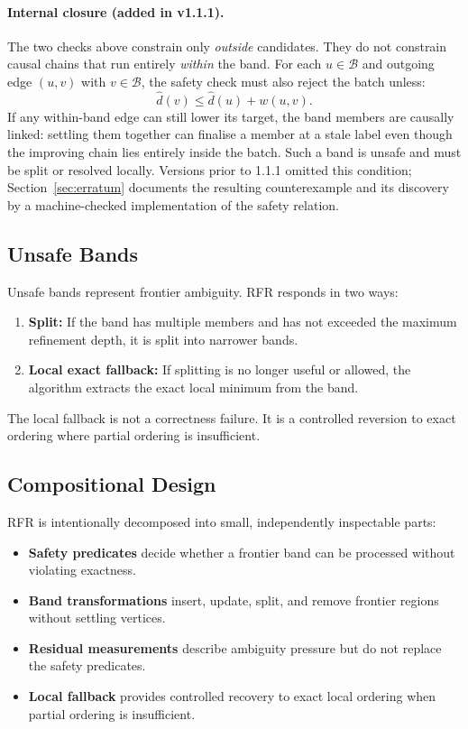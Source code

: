 \documentclass[11pt]{article}
\newcommand{\RFR}{\textsc{RFR}}
\newcommand{\band}{\mathcal{B}}
\begin{document}
\paragraph{Internal closure (added in v1.1.1).}
The two checks above constrain only \emph{outside} candidates. They do not
constrain causal chains that run entirely \emph{within} the band. For each
$u\in\band$ and outgoing edge $(u,v)$ with $v\in\band$, the safety check
must also reject the batch unless:
\[
  \hat d(v) \le \hat d(u) + w(u,v).
\]
If any within-band edge can still lower its target, the band members are
causally linked: settling them together can finalise a member at a stale
label even though the improving chain lies entirely inside the batch. Such a
band is unsafe and must be split or resolved locally. Versions prior to
1.1.1 omitted this condition; Section~\ref{sec:erratum} documents the
resulting counterexample and its discovery by a machine-checked
implementation of the safety relation.

\subsection{Unsafe Bands}

Unsafe bands represent frontier ambiguity. \RFR{} responds in two ways:

\begin{enumerate}
  \item \textbf{Split:} If the band has multiple members and has not exceeded the maximum refinement depth, it is split into narrower bands.
  \item \textbf{Local exact fallback:} If splitting is no longer useful or allowed, the algorithm extracts the exact local minimum from the band.
\end{enumerate}

The local fallback is not a correctness failure. It is a controlled reversion to exact ordering where partial ordering is insufficient.

\subsection{Compositional Design}

\RFR{} is intentionally decomposed into small, independently inspectable parts:

\begin{itemize}
  \item \textbf{Safety predicates} decide whether a frontier band can be processed without violating exactness.
  \item \textbf{Band transformations} insert, update, split, and remove frontier regions without settling vertices.
  \item \textbf{Residual measurements} describe ambiguity pressure but do not replace the safety predicates.
  \item \textbf{Local fallback} provides controlled recovery to exact local ordering when partial ordering is insufficient.
\end{itemize}
\end{document}
